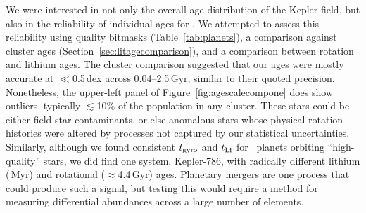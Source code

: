 \documentclass[11pt,twocolumn,tighten]{aastex63}
\begin{document}
We were interested in not only the overall age distribution of the
Kepler field, but also in the reliability of individual ages for .  We attempted to assess this reliability using
quality bitmasks (Table~\ref{tab:planets}), a comparison against cluster ages (Section~\ref{sec:litagecomparison}), and a comparison
between rotation and lithium ages.  The cluster comparison
suggested that our ages were mostly accurate at $\ll$0.5\,dex
across 0.04--2.5\,Gyr, similar to their quoted precision.
Nonetheless, the upper-left panel of Figure~\ref{fig:agescalecompone}
does show outliers, typically $\lesssim$10\% of the population
in any cluster.   
These stars could be either field star contaminants,
or else anomalous stars whose physical rotation histories were altered
by processes not captured by our statistical uncertainties.
Similarly, although we found consistent $t_{\rm gyro}$ and $t_{\rm Li}$
for \ltonegyrhighqconfirmedtwosided\ planets orbiting ``high-quality''
stars, we did find one system, Kepler-786, with radically different
lithium (\kepseveneightsix\,Myr) and rotational
($\approx$4.4\,Gyr) ages.  Planetary mergers
are one process that could produce such a signal, but
testing this would require a method for measuring differential abundances
across a large number of elements.


\end{document}

